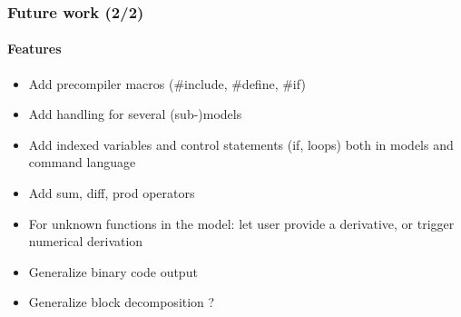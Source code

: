 \documentclass{beamer}
\begin{document}
\begin{frame}
  \frametitle{Future work (2/2)}
  \framesubtitle{Features}
  \begin{itemize}
  \item Add precompiler macros (\#include, \#define, \#if)
  \item Add handling for several (sub-)models
  \item Add indexed variables and control statements (if, loops) both in models and command language
  \item Add sum, diff, prod operators
  \item For unknown functions in the model: let user provide a derivative, or trigger numerical derivation
  \item Generalize binary code output
  \item Generalize block decomposition ?
  \end{itemize}
\end{frame}
\end{document}
